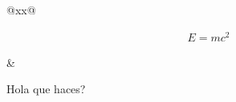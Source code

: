 \documentclass[11pt]{article}
\begin{document}
\maketitle
\brightmode
\begin{tabularx}{\texwidth}{@{}x{\quad}x@{}}
  \begin{minipage}{\linewidth} 
 \begin{align*}
 E = mc^{2}
 \end{align*} 
  \end{minipage}
  &
  \begin{minipage}{\linewidth} 
    Hola que haces?
  \end{minipage}
\end{tabularx}
\end{document}
